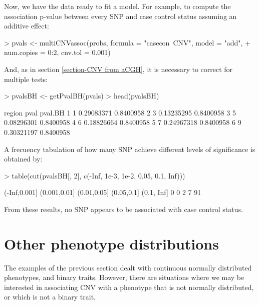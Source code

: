 \documentclass[11pt]{article}
\begin{document}
Now, we have the data ready to fit a model. For example, to compute the association p-value between every SNP and case control status
assuming an additive effect:
\begin{Schunk}
\begin{Sinput}
> pvals <- multiCNVassoc(probs, formula = "casecon~CNV", model = "add",
+ num.copies = 0:2, cnv.tol = 0.001)
\end{Sinput}
\end{Schunk}

And, as in section \ref{section-CNV from aCGH}, it is necessary to correct for multiple tests:
\begin{Schunk}
\begin{Sinput}
> pvalsBH <- getPvalBH(pvals)
> head(pvalsBH)
\end{Sinput}
\begin{Soutput}
  region       pval   pval.BH
1      1 0.29083371 0.8400958
2      3 0.13235295 0.8400958
3      5 0.08296301 0.8400958
4      6 0.18826664 0.8400958
5      7 0.24967318 0.8400958
6      9 0.30321197 0.8400958
\end{Soutput}
\end{Schunk}

A frecuency tabulation of how many SNP achieve different levels of significance is obtained by:
\begin{Schunk}
\begin{Sinput}
> table(cut(pvalsBH[, 2], c(-Inf, 1e-3, 1e-2, 0.05, 0.1, Inf)))
\end{Sinput}
\begin{Soutput}
(-Inf,0.001] (0.001,0.01]  (0.01,0.05]   (0.05,0.1]   (0.1, Inf] 
           0            0            2            7           91 
\end{Soutput}
\end{Schunk}

From these results, no SNP appears to be associated with case control status.



\section{Other phenotype distributions}


The examples of the previous section dealt with continuous normally distributed phenotypes, and binary traits.
However, there are situations where we may be interested in associating CNV with a phenotype that is not normally distributed,
or which is not a binary trait.
\end{document}
